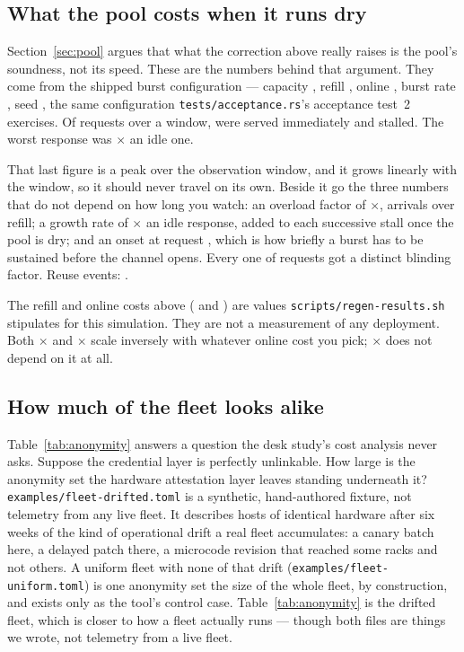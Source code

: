 \documentclass[11pt]{article}
\begin{document}
\subsection{What the pool costs when it runs dry}
\label{sec:results-pool}

Section~\ref{sec:pool} argues that what the correction above really raises is
the pool's soundness, not its speed. These are the numbers behind that
argument. They come from the shipped burst configuration --- capacity
\poolcapacity{}, refill \poolrefillcostsi{}, online \poolonlinecostsi{},
burst rate \poolburstratesi{}, seed \poolseed{}, the same configuration
\texttt{tests/acceptance.rs}'s acceptance test~2 exercises. Of
\poolrequests{} requests over a \poolwindow{} window, \poolserved{} were
served immediately and \poolstalled{} stalled. The worst response was
\poolamplification{}$\times$ an idle one.

That last figure is a peak over the observation window, and it grows linearly
with the window, so it should never travel on its own. Beside it go the
three numbers that do not depend on how long you watch: an overload factor of
\pooloverloadfactor{}$\times$, arrivals over refill; a growth rate of
\poolgrowthperrequest{}$\times$ an idle response, added to each successive
stall once the pool is dry; and an onset at request \poolonsetrequest{},
which is how briefly a burst has to be sustained before the channel opens.
Every one of \pooldistinctblinding{} requests got a distinct blinding factor.
Reuse events: \poolreuseevents{}.

The refill and online costs above (\poolrefillcostsi{} and
\poolonlinecostsi{}) are values \texttt{scripts/regen-results.sh} stipulates
for this simulation. They are not a measurement of any deployment. Both
\poolamplification{}$\times$ and \poolgrowthperrequest{}$\times$ scale
inversely with whatever online cost you pick; \pooloverloadfactor{}$\times$
does not depend on it at all.

\subsection{How much of the fleet looks alike}
\label{sec:results-anonymity}



Table~\ref{tab:anonymity} answers a question the desk study's cost analysis
never asks. Suppose the credential layer is perfectly unlinkable. How large
is the anonymity set the hardware attestation layer leaves standing
underneath it? \texttt{examples/fleet-drifted.toml} is a synthetic,
hand-authored fixture, not telemetry from any live fleet. It describes
\anonfleetsize{} hosts of identical hardware after six weeks of the kind of
operational drift a real fleet accumulates: a canary batch here, a delayed
patch there, a microcode revision that reached some racks and not others. A
uniform fleet with none of that drift
(\texttt{examples/fleet-uniform.toml}) is one anonymity set the size of the
whole fleet, by construction, and exists only as the tool's control case.
Table~\ref{tab:anonymity} is the drifted fleet, which is closer to how a
fleet actually runs --- though both files are things we wrote, not telemetry
from a live fleet.
\end{document}
